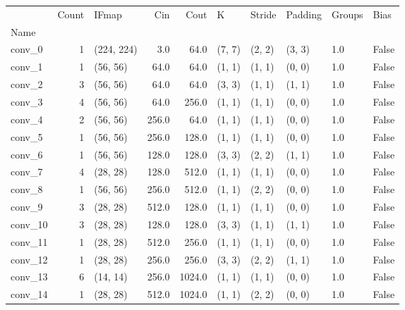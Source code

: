 \begin{center}
    \begin{table}[]
    \begin{tabular}{lrlrrlllll}
        \toprule
        {} &  Count & IFmap &     Cin &    Cout &       K &  Stride & Padding & Groups &   Bias \\
        Name     &        &             &         &         &         &         &         &        &        \\
        \midrule
        conv\_0   & 1 &  (224, 224) &     3.0 &    64.0 &  (7, 7) &  (2, 2) &  (3, 3) &    1.0 &  False \\
        conv\_1   & 1 &    (56, 56) &    64.0 &    64.0 &  (1, 1) &  (1, 1) &  (0, 0) &    1.0 &  False \\
        conv\_2   & 3 &    (56, 56) &    64.0 &    64.0 &  (3, 3) &  (1, 1) &  (1, 1) &    1.0 &  False \\
        conv\_3   & 4 &    (56, 56) &    64.0 &   256.0 &  (1, 1) &  (1, 1) &  (0, 0) &    1.0 &  False \\
        conv\_4   & 2 &    (56, 56) &   256.0 &    64.0 &  (1, 1) &  (1, 1) &  (0, 0) &    1.0 &  False \\
        conv\_5   & 1 &    (56, 56) &   256.0 &   128.0 &  (1, 1) &  (1, 1) &  (0, 0) &    1.0 &  False \\
        conv\_6   & 1 &    (56, 56) &   128.0 &   128.0 &  (3, 3) &  (2, 2) &  (1, 1) &    1.0 &  False \\
        conv\_7   & 4 &    (28, 28) &   128.0 &   512.0 &  (1, 1) &  (1, 1) &  (0, 0) &    1.0 &  False \\
        conv\_8   & 1 &    (56, 56) &   256.0 &   512.0 &  (1, 1) &  (2, 2) &  (0, 0) &    1.0 &  False \\
        conv\_9   & 3 &    (28, 28) &   512.0 &   128.0 &  (1, 1) &  (1, 1) &  (0, 0) &    1.0 &  False \\
        conv\_10  & 3 &    (28, 28) &   128.0 &   128.0 &  (3, 3) &  (1, 1) &  (1, 1) &    1.0 &  False \\
        conv\_11  & 1 &    (28, 28) &   512.0 &   256.0 &  (1, 1) &  (1, 1) &  (0, 0) &    1.0 &  False \\
        conv\_12  & 1 &    (28, 28) &   256.0 &   256.0 &  (3, 3) &  (2, 2) &  (1, 1) &    1.0 &  False \\
        conv\_13  & 6 &    (14, 14) &   256.0 &  1024.0 &  (1, 1) &  (1, 1) &  (0, 0) &    1.0 &  False \\
        conv\_14  & 1 &    (28, 28) &   512.0 &  1024.0 &  (1, 1) &  (2, 2) &  (0, 0) &    1.0 &  False \\

\end{tabular}
\end{table}
\end{center}
